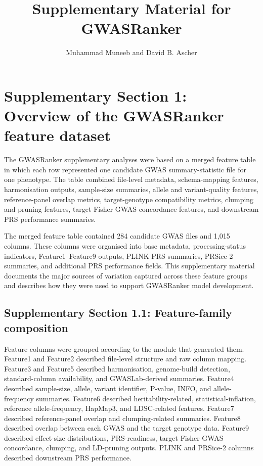 \documentclass[11pt,a4paper]{article}
\title{Supplementary Material for GWASRanker}
\author{Muhammad Muneeb and David B. Ascher}
\date{}
\begin{document}
\maketitle

\section*{Supplementary Section 1: Overview of the GWASRanker feature dataset}

The GWASRanker supplementary analyses were based on a merged feature table in which each row represented one candidate GWAS summary-statistic file for one phenotype. The table combined file-level metadata, schema-mapping features, harmonisation outputs, sample-size summaries, allele and variant-quality features, reference-panel overlap metrics, target-genotype compatibility metrics, clumping and pruning features, target Fisher GWAS concordance features, and downstream PRS performance summaries.

The merged feature table contained 284 candidate GWAS files and 1,015 columns. These columns were organised into base metadata, processing-status indicators, Feature1--Feature9 outputs, PLINK PRS summaries, PRSice-2 summaries, and additional PRS performance fields. This supplementary material documents the major sources of variation captured across these feature groups and describes how they were used to support GWASRanker model development.

\subsection*{Supplementary Section 1.1: Feature-family composition}

Feature columns were grouped according to the module that generated them. Feature1 and Feature2 described file-level structure and raw column mapping. Feature3 and Feature5 described harmonisation, genome-build detection, standard-column availability, and GWASLab-derived summaries. Feature4 described sample-size, allele, variant identifier, P-value, INFO, and allele-frequency summaries. Feature6 described heritability-related, statistical-inflation, reference allele-frequency, HapMap3, and LDSC-related features. Feature7 described reference-panel overlap and clumping-related summaries. Feature8 described overlap between each GWAS and the target genotype data. Feature9 described effect-size distributions, PRS-readiness, target Fisher GWAS concordance, clumping, and LD-pruning outputs. PLINK and PRSice-2 columns described downstream PRS performance.
\end{document}
